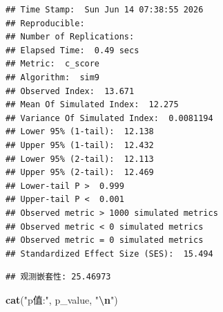 \documentclass[
  twoside,12pt,fontset=none]{ctexbook}
\newenvironment{Shaded}{\begin{snugshade}}{\end{snugshade}}
\newcommand{\AttributeTok}[1]{\textcolor[rgb]{0.13,0.29,0.53}{#1}}
\newcommand{\CommentTok}[1]{\textcolor[rgb]{0.56,0.35,0.01}{\textit{#1}}}
\newcommand{\ControlFlowTok}[1]{\textcolor[rgb]{0.13,0.29,0.53}{\textbf{#1}}}
\newcommand{\DecValTok}[1]{\textcolor[rgb]{0.00,0.00,0.81}{#1}}
\newcommand{\FunctionTok}[1]{\textcolor[rgb]{0.13,0.29,0.53}{\textbf{#1}}}
\newcommand{\NormalTok}[1]{#1}
\newcommand{\OtherTok}[1]{\textcolor[rgb]{0.56,0.35,0.01}{#1}}
\newcommand{\SpecialCharTok}[1]{\textcolor[rgb]{0.81,0.36,0.00}{\textbf{#1}}}
\newcommand{\StringTok}[1]{\textcolor[rgb]{0.31,0.60,0.02}{#1}}
\begin{document}
\begin{verbatim}
## Time Stamp:  Sun Jun 14 07:38:55 2026 
## Reproducible:  
## Number of Replications:  
## Elapsed Time:  0.49 secs 
## Metric:  c_score 
## Algorithm:  sim9 
## Observed Index:  13.671 
## Mean Of Simulated Index:  12.275 
## Variance Of Simulated Index:  0.0081194 
## Lower 95% (1-tail):  12.138 
## Upper 95% (1-tail):  12.432 
## Lower 95% (2-tail):  12.113 
## Upper 95% (2-tail):  12.469 
## Lower-tail P >  0.999 
## Upper-tail P <  0.001 
## Observed metric > 1000 simulated metrics 
## Observed metric < 0 simulated metrics 
## Observed metric = 0 simulated metrics 
## Standardized Effect Size (SES):  15.494
\end{verbatim}

\begin{Shaded}
\end{Shaded}

\begin{verbatim}
## 观测嵌套性: 25.46973
\end{verbatim}

\begin{Shaded}
\begin{Highlighting}[]
\FunctionTok{cat}\NormalTok{(}\StringTok{"p值:"}\NormalTok{, p\_value, }\StringTok{"}\SpecialCharTok{\textbackslash{}n}\StringTok{"}\NormalTok{)}
\end{Highlighting}
\end{Shaded}
\end{document}
